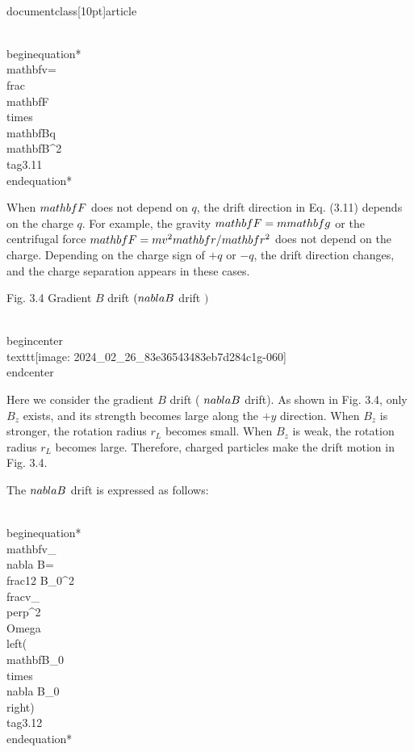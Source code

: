 \\documentclass[10pt]{article}
\begin{document}
\\begin{equation*}
\\mathbf{v}=\\frac{\\mathbf{F} \\times \\mathbf{B}}{q \\mathbf{B}^{2}} \\tag{3.11}
\\end{equation*}


When $\\mathbf{F}$ does not depend on $q$, the drift direction in Eq. (3.11) depends on the charge $q$. For example, the gravity $\\mathbf{F}=m \\mathbf{g}$ or the centrifugal force $\\mathbf{F}=m v^{2} \\mathbf{r} / \\mathbf{r}^{2}$ does not depend on the charge. Depending on the charge sign of $+q$ or $-q$, the drift direction changes, and the charge separation appears in these cases.

Fig. 3.4 Gradient $B$ drift $(\\nabla B$ drift $)$

\\begin{center}
\\texttt{[image: 2024\_02\_26\_83e36543483eb7d284c1g-060]}
\\end{center}

Here we consider the gradient $B$ drift ( $\\nabla B$ drift). As shown in Fig. 3.4, only $B_{z}$ exists, and its strength becomes large along the $+y$ direction. When $B_{z}$ is stronger, the rotation radius $r_{L}$ becomes small. When $B_{z}$ is weak, the rotation radius $r_{L}$ becomes large. Therefore, charged particles make the drift motion in Fig. 3.4.

The $\\nabla B$ drift is expressed as follows:


\\begin{equation*}
\\mathbf{v}_{\\nabla B}=\\frac{1}{2 B_{0}^{2}} \\frac{v_{\\perp}^{2}}{\\Omega}\\left(\\mathbf{B}_{0} \\times \\nabla B_{0}\\right) \\tag{3.12}
\\end{equation*}
\end{document}
